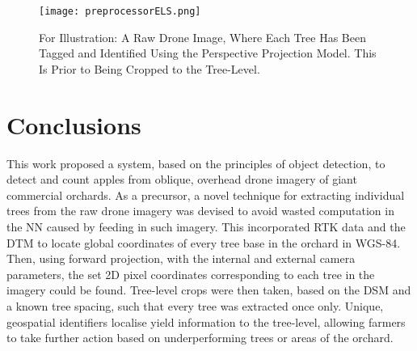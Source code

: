 \documentclass[journal]{IEEEtran}
\begin{document}
\begin{figure*}[h]
    \centering
    \texttt{[image: preprocessorELS.png]}
    \caption{For Illustration: A Raw Drone Image, Where Each Tree Has Been Tagged and Identified Using the Perspective Projection Model. This Is Prior to Being Cropped to the Tree-Level.}
    \label{fig:preprocessorELS}
\end{figure*}





























\section{Conclusions}\label{sec_concl}

This work proposed a system, based on the principles of object detection, to detect and count apples from oblique, overhead drone imagery of giant commercial orchards. As a precursor, a novel technique for extracting individual trees from the raw drone imagery was devised to avoid wasted computation in the NN caused by feeding in such imagery. This incorporated RTK data and the DTM to locate global coordinates of every tree base in the orchard in WGS-84. Then, using forward projection, with the internal and external camera parameters, the set 2D pixel coordinates corresponding to each tree in the imagery could be found. Tree-level crops were then taken, based on the DSM and a known tree spacing, such that every tree was extracted once only. Unique, geospatial identifiers localise yield information to the tree-level, allowing farmers to take further action based on underperforming trees or areas of the orchard.
\end{document}
